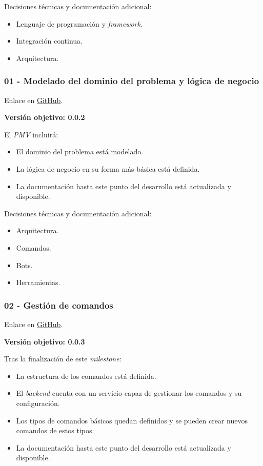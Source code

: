 Decisiones técnicas y documentación adicional:

\begin{itemize}
	\item Lenguaje de programación y \textit{framework}.
	\item Integración continua.
	\item Arquitectura.
\end{itemize}

\subsubsection{01 - Modelado del dominio del problema y lógica de negocio}

Enlace en \href{https://github.com/harvestcore/matroos/milestone/12}{GitHub}.

\textbf{Versión objetivo: 0.0.2}

El \textit{PMV} incluirá:

\begin{itemize}
	\item El dominio del problema está modelado.
	\item La lógica de negocio en su forma más básica está definida.
	\item La documentación hasta este punto del desarrollo está actualizada y disponible.
\end{itemize}

Decisiones técnicas y documentación adicional:

\begin{itemize}
	\item Arquitectura.
	\item Comandos.
	\item Bots.
	\item Herramientas.
\end{itemize}

\subsubsection{02 - Gestión de comandos}

Enlace en \href{https://github.com/harvestcore/matroos/milestone/10}{GitHub}.

\textbf{Versión objetivo: 0.0.3}

Tras la finalización de este \textit{milestone}:

\begin{itemize}
	\item La estructura de los comandos está definida.
	\item El \textit{backend} cuenta con un servicio capaz de gestionar los comandos y su configuración.
	\item Los tipos de comandos básicos quedan definidos y se pueden crear nuevos comandos de estos tipos.
	\item La documentación hasta este punto del desarrollo está actualizada y disponible.
\end{itemize}


